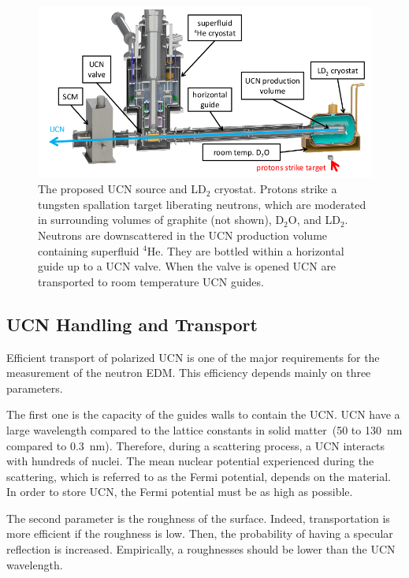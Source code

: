 \begin{figure}[h!]
  \centering
  \includegraphics[width=1.0\textwidth]{newUCNsource.png}
  \caption{The proposed UCN source and LD$_2$ cryostat. Protons strike
    a tungsten spallation target liberating neutrons, which are
    moderated in surrounding volumes of graphite (not shown), D$_2$O,
    and LD$_2$. Neutrons are downscattered in the UCN production
    volume containing superfluid $^4$He. They are bottled within a
    horizontal guide up to a UCN valve. When the valve is opened UCN
    are transported to room temperature UCN guides.}
  \label{fig:newUCNsource}
\end{figure}





\subsection{UCN Handling and Transport}

Efficient transport of polarized UCN is one of the major requirements
for the measurement of the neutron EDM. This efficiency depends mainly
on three parameters.

The first one is the capacity of the guides walls to contain the
UCN. UCN have a large wavelength compared to the lattice constants in
solid matter~(50 to 130~nm compared to 0.3~nm). Therefore, during a
scattering process, a UCN interacts with hundreds of nuclei. The mean
nuclear potential experienced during the scattering, which is referred
to as the Fermi potential, depends on the material. In order to store
UCN, the Fermi potential must be as high as possible.

The second parameter is the roughness of the surface. Indeed,
transportation is more efficient if the roughness is low. Then, the
probability of having a specular reflection is increased. Empirically,
a roughnesses should be lower than the UCN wavelength.

